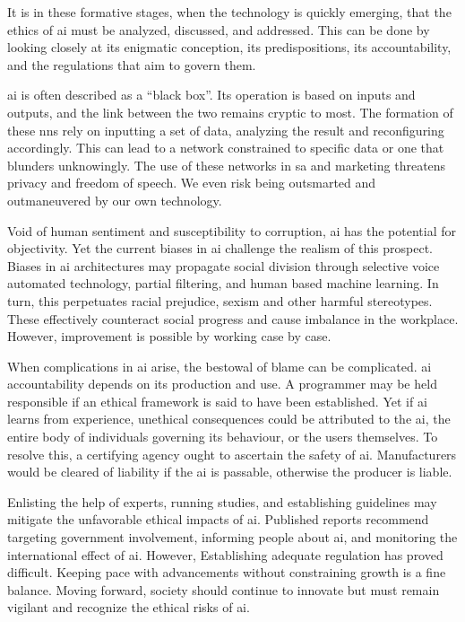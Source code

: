 \documentclass[11pt]{article}
\begin{document}
It is in these formative stages, when the technology is quickly emerging, that the ethics of \gls{ai} must be analyzed, discussed, and addressed. 
This can be done by looking closely at its enigmatic conception, its predispositions, its accountability, and the regulations that aim to govern them. 

\gls{ai} is often described as a ``black box''. 
Its operation is based on inputs and outputs, and the link between the two remains cryptic to most. 
The formation of these \glspl{nn} rely on inputting a set of data, analyzing the result and reconfiguring accordingly. 
This can lead to a network constrained to specific data or one that blunders unknowingly. 
The use of these networks in \gls{sa} and marketing threatens privacy and freedom of speech. 
We even risk being outsmarted and outmaneuvered by our own technology.  

Void of human sentiment and susceptibility to corruption, \gls{ai} has the potential for objectivity. 
Yet the current biases in \gls{ai} challenge the realism of this prospect. 
Biases in \gls{ai} architectures may propagate social division through selective voice automated technology, partial filtering, and human based machine learning. 
In turn, this perpetuates racial prejudice, sexism and other harmful stereotypes. 
These effectively counteract social progress and cause imbalance in the workplace. 
However, improvement is possible by working case by case.

When complications in \gls{ai} arise, the bestowal of blame can be complicated. 
\gls{ai} accountability  depends on its production and use. 
A programmer may be held responsible if an  ethical framework is said to have been established. 
Yet if \gls{ai} learns from experience, unethical consequences could be attributed to the \gls{ai}, the entire body of individuals governing its behaviour, or the users themselves. 
To resolve this, a certifying agency ought to ascertain the safety of \gls{ai}. 
Manufacturers would be cleared of liability if the \gls{ai} is passable, otherwise the producer is liable.

Enlisting the help of experts, running studies, and establishing guidelines may mitigate the  unfavorable ethical impacts of \gls{ai}. 
Published reports recommend targeting government involvement, informing people about \gls{ai}, and monitoring the international effect of \gls{ai}. 
However, Establishing adequate regulation has proved difficult. Keeping pace with advancements without constraining growth is a fine balance. 
Moving forward, society should continue to innovate but must remain vigilant and recognize the ethical risks of \gls{ai}. 






\end{document}
